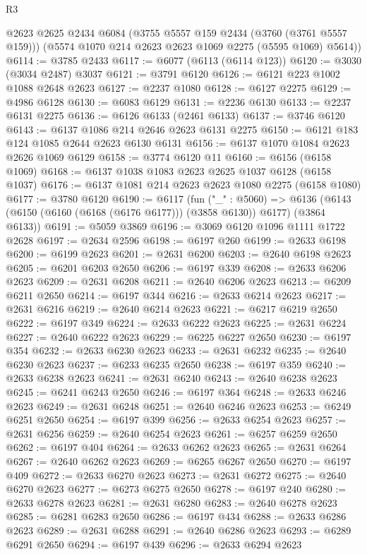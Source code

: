\begin{lexlean}{R3}
\begin{coremodule}
      @2623
      @2625
      @2434
      @6084
      (@3755 @5557 @159 @2434 (@3760 (@3761 @5557 @159)))
      (@5574 @1070 @214 @2623 @2623 @1069 @2275 (@5595 @1069) @5614))
@6114 := @3785 @2433
@6117 := @6077 (@6113 (@6114 @123))
@6120 := @3030 (@3034 @2487) @3037
@6121 := @3791 @6120
@6126 := @6121 @223 @1002 @1088 @2648 @2623
@6127 := @2237 @1080
@6128 := @6127 @2275
@6129 := @4986 @6128
@6130 := @6083 @6129
@6131 := @2236 @6130
@6133 := @2237 @6131 @2275
@6136 := @6126 @6133 (@2461 @6133)
@6137 := @3746 @6120
@6143 := @6137 @1086 @214 @2646 @2623 @6131 @2275
@6150 := @6121 @183 @124 @1085 @2644 @2623 @6130 @6131
@6156 := @6137 @1070 @1084 @2623 @2626 @1069 @6129
@6158 := @3774 @6120 @11
@6160 := @6156 (@6158 @1069)
@6168 := @6137 @1038 @1083 @2623 @2625 @1037 @6128 (@6158 @1037)
@6176 := @6137 @1081 @214 @2623 @2623 @1080 @2275 (@6158 @1080)
@6177 := @3780 @6120
@6190 := @6117
    (fun ("_" : @5060) =>
    @6136 (@6143 (@6150 (@6160 (@6168 (@6176 @6177))) (@3858 @6130)) @6177) (@3864 @6133))
@6191 := @5059 @3869
@6196 := @3069 @6120 @1096 @1111 @1722 @2628
@6197 := @2634 @2596
@6198 := @6197 @260
@6199 := @2633 @6198
@6200 := @6199 @2623
@6201 := @2631 @6200
@6203 := @2640 @6198 @2623
@6205 := @6201 @6203 @2650
@6206 := @6197 @339
@6208 := @2633 @6206 @2623
@6209 := @2631 @6208
@6211 := @2640 @6206 @2623
@6213 := @6209 @6211 @2650
@6214 := @6197 @344
@6216 := @2633 @6214 @2623
@6217 := @2631 @6216
@6219 := @2640 @6214 @2623
@6221 := @6217 @6219 @2650
@6222 := @6197 @349
@6224 := @2633 @6222 @2623
@6225 := @2631 @6224
@6227 := @2640 @6222 @2623
@6229 := @6225 @6227 @2650
@6230 := @6197 @354
@6232 := @2633 @6230 @2623
@6233 := @2631 @6232
@6235 := @2640 @6230 @2623
@6237 := @6233 @6235 @2650
@6238 := @6197 @359
@6240 := @2633 @6238 @2623
@6241 := @2631 @6240
@6243 := @2640 @6238 @2623
@6245 := @6241 @6243 @2650
@6246 := @6197 @364
@6248 := @2633 @6246 @2623
@6249 := @2631 @6248
@6251 := @2640 @6246 @2623
@6253 := @6249 @6251 @2650
@6254 := @6197 @399
@6256 := @2633 @6254 @2623
@6257 := @2631 @6256
@6259 := @2640 @6254 @2623
@6261 := @6257 @6259 @2650
@6262 := @6197 @404
@6264 := @2633 @6262 @2623
@6265 := @2631 @6264
@6267 := @2640 @6262 @2623
@6269 := @6265 @6267 @2650
@6270 := @6197 @409
@6272 := @2633 @6270 @2623
@6273 := @2631 @6272
@6275 := @2640 @6270 @2623
@6277 := @6273 @6275 @2650
@6278 := @6197 @240
@6280 := @2633 @6278 @2623
@6281 := @2631 @6280
@6283 := @2640 @6278 @2623
@6285 := @6281 @6283 @2650
@6286 := @6197 @434
@6288 := @2633 @6286 @2623
@6289 := @2631 @6288
@6291 := @2640 @6286 @2623
@6293 := @6289 @6291 @2650
@6294 := @6197 @439
@6296 := @2633 @6294 @2623

\end{coremodule}
\end{lexlean}
